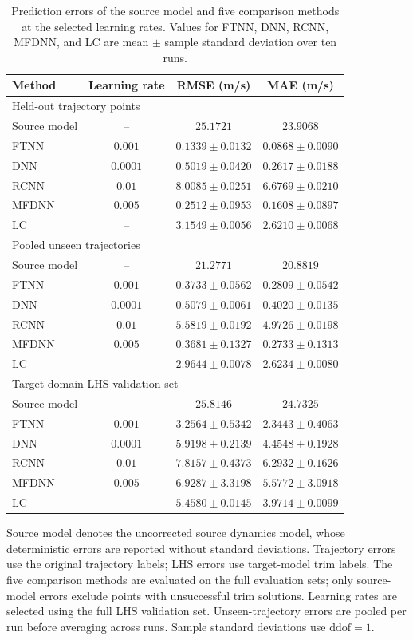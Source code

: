 \begin{table}[width=\linewidth,cols=4,pos=htbp]
\caption{Prediction errors of the source model and five comparison methods at the selected learning rates. Values for FTNN, DNN, RCNN, MFDNN, and LC are mean $\pm$ sample standard deviation over ten runs.}
\label{tab:selected-model-comparison}
\small
\begin{tabular*}{\tblwidth}{@{\extracolsep{\fill}}lccc@{}}
\toprule
Method & Learning rate & RMSE (m/s) & MAE (m/s) \\
\midrule
\multicolumn{4}{l}{Held-out trajectory points} \\
Source model & -- & $25.1721$ & $23.9068$ \\
FTNN & $0.001$ & $0.1339\pm0.0132$ & $0.0868\pm0.0090$ \\
DNN & $0.0001$ & $0.5019\pm0.0420$ & $0.2617\pm0.0188$ \\
RCNN & $0.01$ & $8.0085\pm0.0251$ & $6.6769\pm0.0210$ \\
MFDNN & $0.005$ & $0.2512\pm0.0953$ & $0.1608\pm0.0897$ \\
LC & -- & $3.1549\pm0.0056$ & $2.6210\pm0.0068$ \\
\midrule
\multicolumn{4}{l}{Pooled unseen trajectories} \\
Source model & -- & $21.2771$ & $20.8819$ \\
FTNN & $0.001$ & $0.3733\pm0.0562$ & $0.2809\pm0.0542$ \\
DNN & $0.0001$ & $0.5079\pm0.0061$ & $0.4020\pm0.0135$ \\
RCNN & $0.01$ & $5.5819\pm0.0192$ & $4.9726\pm0.0198$ \\
MFDNN & $0.005$ & $0.3681\pm0.1327$ & $0.2733\pm0.1313$ \\
LC & -- & $2.9644\pm0.0078$ & $2.6234\pm0.0080$ \\
\midrule
\multicolumn{4}{l}{Target-domain LHS validation set} \\
Source model & -- & $25.8146$ & $24.7325$ \\
FTNN & $0.001$ & $3.2564\pm0.5342$ & $2.3443\pm0.4063$ \\
DNN & $0.0001$ & $5.9198\pm0.2139$ & $4.4548\pm0.1928$ \\
RCNN & $0.01$ & $7.8157\pm0.4373$ & $6.2932\pm0.1626$ \\
MFDNN & $0.005$ & $6.9287\pm3.3198$ & $5.5772\pm3.0918$ \\
LC & -- & $5.4580\pm0.0145$ & $3.9714\pm0.0099$ \\
\bottomrule
\end{tabular*}
\smallskip
\footnotesize
Source model denotes the uncorrected source dynamics model, whose deterministic errors are reported without standard deviations. Trajectory errors use the original trajectory labels; LHS errors use target-model trim labels. The five comparison methods are evaluated on the full evaluation sets; only source-model errors exclude points with unsuccessful trim solutions. Learning rates are selected using the full LHS validation set. Unseen-trajectory errors are pooled per run before averaging across runs. Sample standard deviations use $\mathrm{ddof}=1$.
\end{table}
